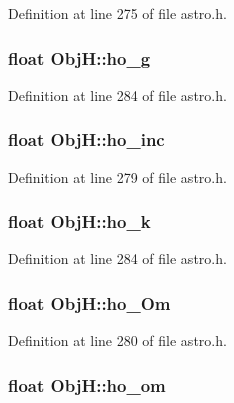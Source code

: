 Definition at line 275 of file astro.\-h.

\hypertarget{struct_obj_h_a0d24d7f726f07bcbf17a8efd17d0fa52}{
\subsubsection[{ho\-\_\-g}]{\setlength{\rightskip}{0pt plus 5cm}float Obj\-H\-::ho\-\_\-g}}\label{struct_obj_h_a0d24d7f726f07bcbf17a8efd17d0fa52}


Definition at line 284 of file astro.\-h.

\hypertarget{struct_obj_h_ae6a3a975d680d5b55ffaa38cd2183476}{
\subsubsection[{ho\-\_\-inc}]{\setlength{\rightskip}{0pt plus 5cm}float Obj\-H\-::ho\-\_\-inc}}\label{struct_obj_h_ae6a3a975d680d5b55ffaa38cd2183476}


Definition at line 279 of file astro.\-h.

\hypertarget{struct_obj_h_a9c3656cdd0720d38c878fb01801e5fd5}{
\subsubsection[{ho\-\_\-k}]{\setlength{\rightskip}{0pt plus 5cm}float Obj\-H\-::ho\-\_\-k}}\label{struct_obj_h_a9c3656cdd0720d38c878fb01801e5fd5}


Definition at line 284 of file astro.\-h.

\hypertarget{struct_obj_h_ad379f0625db7fcc67e51493110760de8}{
\subsubsection[{ho\-\_\-\-Om}]{\setlength{\rightskip}{0pt plus 5cm}float Obj\-H\-::ho\-\_\-\-Om}}\label{struct_obj_h_ad379f0625db7fcc67e51493110760de8}


Definition at line 280 of file astro.\-h.

\hypertarget{struct_obj_h_a4a4312e20e35070f22625697e0da31ec}{
\subsubsection[{ho\-\_\-om}]{\setlength{\rightskip}{0pt plus 5cm}float Obj\-H\-::ho\-\_\-om}}\label{struct_obj_h_a4a4312e20e35070f22625697e0da31ec}


